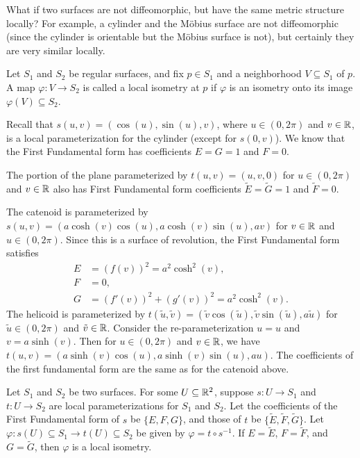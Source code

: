 \begin{rmk}
    What if two surfaces are not diffeomorphic, but have the same metric structure locally? For example, a cylinder and the M\"obius surface are not diffeomorphic (since the cylinder is orientable but the M\"obius surface is not), but certainly they are very similar locally.
\end{rmk}

\begin{defn}
    Let $S_1$ and $S_2$ be regular surfaces, and fix $p \in S_1$ and a neighborhood $V \subseteq S_1$ of $p$. A map $\varphi: V \to S_2$ is called a local isometry at $p$ if $\varphi$ is an isometry onto its image $\varphi(V) \subseteq S_2$.
\end{defn}

\begin{exmp}
    Recall that $s(u, v) = (\cos(u), \sin(u), v)$, where $u \in (0, 2\pi)$ and $v \in \mathbb{R}$, is a local parameterization for the cylinder (except for $s(0, v)$). We know that the First Fundamental form has coefficients $E = G = 1$ and $F = 0$.

    The portion of the plane parameterized by $t(u, v) = (u, v, 0)$ for $u \in (0, 2\pi)$ and $v \in \mathbb{R}$ also has First Fundamental form coefficients $\tilde{E} = \tilde{G} = 1$ and $\tilde{F} = 0$.
\end{exmp}

\begin{exmp}
    The catenoid is parameterized by $s(u, v) = (a\cosh(v)\cos(u), a\cosh(v)\sin(u), av)$ for $v \in \mathbb{R}$ and $u \in (0, 2\pi)$. Since this is a surface of revolution, the First Fundamental form satisfies
    \begin{align*}
        E &= (f(v))^2 = a^2\cosh^2(v), \\
        F &= 0, \\
        G &= (f'(v))^2 + (g'(v))^2 = a^2\cosh^2(v).
    \end{align*}
    The helicoid is parameterized by $t(\tilde{u}, \tilde{v}) = (\tilde{v}\cos(\tilde{u}), \tilde{v}\sin(\tilde{u}), a\tilde{u})$ for $\tilde{u} \in (0, 2\pi)$ and $\tilde{v} \in \mathbb{R}$. Consider the re-parameterization $u = u$ and $v = a\sinh(v)$. Then for $u \in (0, 2\pi)$ and $v \in \mathbb{R}$, we have $t(u, v) = (a\sinh(v)\cos(u), a\sinh(v)\sin(u), au)$. The coefficients of the first fundamental form are the same as for the catenoid above.
\end{exmp}

\begin{thm}
    Let $S_1$ and $S_2$ be two surfaces. For some $U \subseteq \mathbb{R}^2$, suppose $s: U \to S_1$ and $t: U \to S_2$ are local parameterizations for $S_1$ and $S_2$. Let the coefficients of the First Fundamental form of $s$ be $\{E, F, G\}$, and those of $t$ be $\{\tilde{E}, \tilde{F}, \tilde{G}\}$. Let $\varphi: s(U) \subseteq S_1 \to t(U) \subseteq S_2$ be given by $\varphi = t \circ s^{-1}$. If $E = \tilde{E}$, $F = \tilde{F}$, and $G = \tilde{G}$, then $\varphi$ is a local isometry.
\end{thm}

